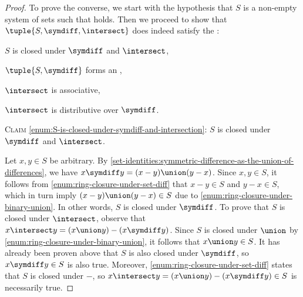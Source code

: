 \begin{proof}
    \vspace{0.3cm}
    \noindent
    To prove the converse, we start with the hypothesis that \( S \) is a non-empty system of sets such that
     holds.
    Then we proceed to show that \( \tuple{S, \symdiff, \intersect} \) does indeed satisfy the :
    \begin{enumerate*}[label=(\roman*)]
        \item \( S \) is closed under \( \symdiff \) and \( \intersect \), \label{enum:S-is-closed-under-symdiff-and-intersection}
        \item \( \tuple{S, \symdiff} \) forms an , \label{enum:S-symdiff-forms-abelian-group}
        \item \( \intersect \) is associative, \label{enum:intersect-is-associative}
        \item \( \intersect \) is distributive over \( \symdiff \). \label{enum:intersect-distributes-over-symdiff}
    \end{enumerate*}

    \vspace{0.3cm}
    \noindent
    \textsc{Claim} \ref{enum:S-is-closed-under-symdiff-and-intersection}: \( S \) is closed under \( \symdiff \) and \( \intersect \).

    \vspace{0.1cm}
    \noindent
    Let \( x, y \in S \) be arbitrary. By \cref{set-identities:symmetric-difference-as-the-union-of-differences},
    we have \( x \symdiff y = \mleft( x - y \mright) \union \mleft( y - x \mright) \). Since \( x, y \in S \), it
    follows from \ref{enum:ring-closure-under-set-diff} that \( x - y \in S \) and \( y - x \in S \),
    which in turn imply \( \mleft( x - y \mright) \union \mleft( y - x \mright) \in S \) due to \ref{enum:ring-closure-under-binary-union}.
    In other words, \( S \) is closed under \( \symdiff \).
    To prove that \( S \) is closed under \( \intersect \), observe that \( x \intersect y = \mleft( x \union y \mright) - \mleft( x \symdiff y \mright) \).
    Since \( S \) is closed under \( \union \) by \ref{enum:ring-closure-under-binary-union}, it follows that \( x \union y \in S \). It has already been proven
    above that \( S \) is also closed under \( \symdiff \), so \( x \symdiff y \in S \) is also true. Moreover, \ref{enum:ring-closure-under-set-diff} states that
    \( S \) is closed under \( - \), so \( x \intersect y = \mleft( x \union y \mright) - \mleft( x \symdiff y \mright) \in S \) is necessarily true.


\end{proof}
